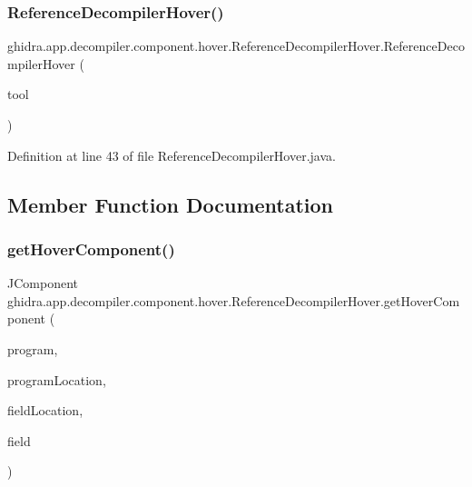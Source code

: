 \subsubsection{\texorpdfstring{ReferenceDecompilerHover()}{ReferenceDecompilerHover()}}
{\footnotesize\ttfamily ghidra.\+app.\+decompiler.\+component.\+hover.\+Reference\+Decompiler\+Hover.\+Reference\+Decompiler\+Hover (\begin{DoxyParamCaption}\item[{Plugin\+Tool}]{tool }\end{DoxyParamCaption})\hspace{0.3cm}{\ttfamily [inline]}}



Definition at line 43 of file Reference\+Decompiler\+Hover.\+java.



\subsection{Member Function Documentation}
\mbox{\label{classghidra_1_1app_1_1decompiler_1_1component_1_1hover_1_1_reference_decompiler_hover_a8ee51e3b987f10ea9c5d9dda29b11611}} 
\subsubsection{\texorpdfstring{getHoverComponent()}{getHoverComponent()}}
{\footnotesize\ttfamily J\+Component ghidra.\+app.\+decompiler.\+component.\+hover.\+Reference\+Decompiler\+Hover.\+get\+Hover\+Component (\begin{DoxyParamCaption}\item[{Program}]{program,  }\item[{Program\+Location}]{program\+Location,  }\item[{Field\+Location}]{field\+Location,  }\item[{Field}]{field }\end{DoxyParamCaption})\hspace{0.3cm}{\ttfamily [inline]}}



